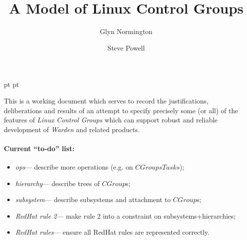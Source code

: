 \documentclass[a4paper,twoside,12pt]{article}
\begin{document}
 pt
 pt

\def\Slash{\slash\hspace{0pt}}

\title{A Model of Linux Control Groups}

\author{
Glyn Normington\and
Steve Powell
}

\maketitle
\thispagestyle{myheadings}
\setcounter{page}{1}


This is a working document which serves to record the justifications, deliberations and results of an attempt to
specify precisely some (or all) of the features of \emph{Linux Control Groups} which can support robust and reliable development of \emph{Warden} and related products.

\paragraph{Current ``to-do'' list:}
\begin{itemize}
\item \emph{ops}--- describe more operations (e.g. on $CGroupsTasks$);
\item \emph{hierarchy}--- describe trees of $CGroup$s;
\item \emph{subsystem}--- describe subsystems and attachment to $CGroup$s;
\item \emph{RedHat rule 2}--- make rule 2 into a constraint on subsystems+hierarchies;
\item \emph{RedHat rules}--- ensure all RedHat rules are represented correctly.
\end{itemize}



\newcommand{\true}{true}
\newcommand{\false}{false}
\renewcommand{\emptyset}{\varnothing}

\clearpage
\tableofcontents
\end{document}
